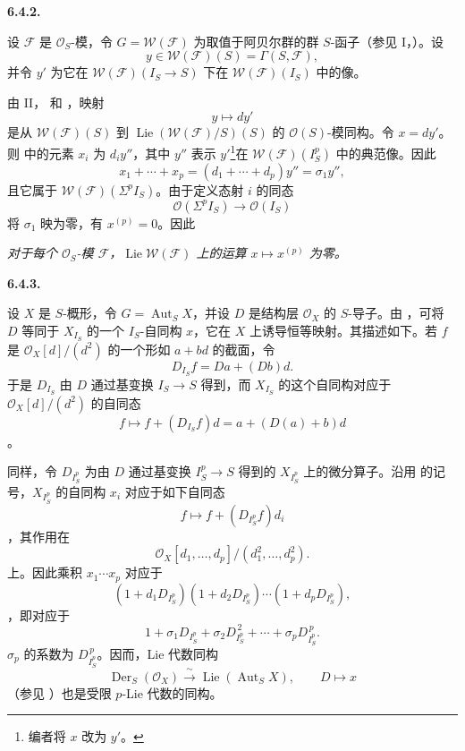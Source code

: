 \medskip
\noindent\textbf{6.4.2.}
\label{sga3:VIIA:6.4.2}

设 \(\mathcal F\) 是 \(\mathcal O_S\)-模，令 \(G=\mathcal W(\mathcal F)\) 为取值于阿贝尔群的群 \(S\)-函子（参见 I，）。设
\[
  y\in\mathcal W(\mathcal F)(S)=\Gamma(S,\mathcal F),
\]
并令 \(y'\) 为它在 \(\mathcal W(\mathcal F)(I_S\to S)\) 下在 \(\mathcal W(\mathcal F)(I_S)\) 中的像。

由 II， 和 ，映射
\[
  y\longmapsto dy'
\]
是从 \(\mathcal W(\mathcal F)(S)\) 到 \(\operatorname{Lie}(\mathcal W(\mathcal F)/S)(S)\) 的 \(\mathcal O(S)\)-模同构。令 \(x=dy'\)。则  中的元素 \(x_i\) 为 \(d_i y''\)，其中 \(y''\) 表示 \(y'\)\footnote{编者将 \(x\) 改为 \(y'\)。}在 \(\mathcal W(\mathcal F)(I_S^p)\) 中的典范像。因此
\[
  x_1+\cdots+x_p
  =
  (d_1+\cdots+d_p)y''
  =
  \sigma_1y'',
\]
且它属于 \(\mathcal W(\mathcal F)(\Sigma^p I_S)\)。由于定义态射 \(i\) 的同态
\[
  \mathcal O(\Sigma^p I_S)\longrightarrow\mathcal O(I_S)
\]
将 \(\sigma_1\) 映为零，有 \(x^{(p)}=0\)。因此
\begin{center}
  \textit{对于每个 \(\mathcal O_S\)-模 \(\mathcal F\)，\(\operatorname{Lie}\mathcal W(\mathcal F)\) 上的运算 \(x\mapsto x^{(p)}\) 为零。}
\end{center}

\medskip
\noindent\textbf{6.4.3.}
\label{sga3:VIIA:6.4.3}

设 \(X\) 是 \(S\)-概形，令 \(G=\operatorname{Aut}_S X\)，并设 \(D\) 是结构层 \(\mathcal O_X\) 的 \(S\)-导子。由 ，可将 \(D\) 等同于 \(X_{I_S}\) 的一个 \(I_S\)-自同构 \(x\)，它在 \(X\) 上诱导恒等映射。其描述如下。若 \(f\) 是 \(\mathcal O_X[d]/(d^2)\) 的一个形如 \(a+bd\) 的截面，令
\[
  D_{I_S}f=Da+(Db)d.
\]
于是 \(D_{I_S}\) 由 \(D\) 通过基变换 \(I_S\to S\) 得到，而 \(X_{I_S}\) 的这个自同构对应于 \(\mathcal O_X[d]/(d^2)\) 的自同态
\[
  f\longmapsto f+(D_{I_S}f)d
  =
  a+(D(a)+b)d
\]
。

同样，令 \(D_{I_S^p}\) 为由 \(D\) 通过基变换 \(I_S^p\to S\) 得到的 \(X_{I_S^p}\) 上的微分算子。沿用  的记号，\(X_{I_S^p}\) 的自同构 \(x_i\) 对应于如下自同态
\[
  f\longmapsto f+(D_{I_S^p}f)d_i
\]
，其作用在
\[
  \mathcal O_X[d_1,\ldots,d_p]/(d_1^2,\ldots,d_p^2).
\]
上。因此乘积 \(x_1\cdots x_p\) 对应于
\[
  (1+d_1D_{I_S^p})(1+d_2D_{I_S^p})\cdots
  (1+d_pD_{I_S^p}),
\]
，即对应于
\[
  1+\sigma_1D_{I_S^p}
  +\sigma_2D_{I_S^p}^{\,2}
  +\cdots+
  \sigma_pD_{I_S^p}^{\,p}.
\]
\(\sigma_p\) 的系数为 \(D_{I_S^p}^{\,p}\)。因而，Lie 代数同构
\[
  \operatorname{Der}_S(\mathcal O_X)
  \xrightarrow{\ \sim\ }
  \operatorname{Lie}(\operatorname{Aut}_S X),
  \qquad
  D\longmapsto x
\]
（参见 ）也是受限 \(p\)-Lie 代数的同构。

